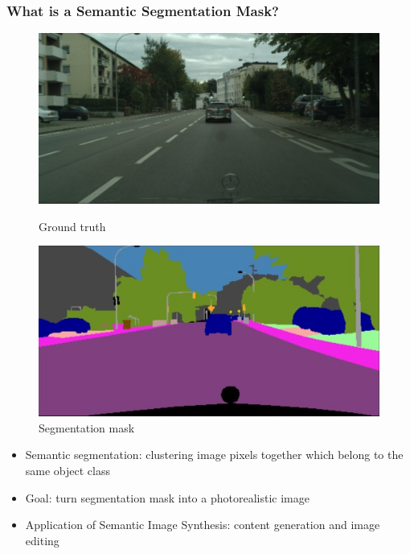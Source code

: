 \documentclass{beamer}
\begin{document}
\begin{frame}
	\frametitle{What is a Semantic Segmentation Mask?}
	
    \begin{figure}
        \begin{minipage}[b]{0.45\linewidth}
            \centering
            \includegraphics[width=\textwidth]{figures/ground_truth.png}
            \caption{Ground truth \cite{park2019semantic}}
        \end{minipage}
        \hspace{0.5cm}
        \begin{minipage}[b]{0.45\linewidth}
            \centering
            \includegraphics[width=\textwidth]{figures/segmentation.png}
            \caption{Segmentation mask \cite{park2019semantic}}
        \end{minipage}
    \end{figure}
    
    \begin{itemize}
	    \item Semantic segmentation: clustering image pixels together which belong to the same object class \cite{thoma2016survey}
	    \item Goal: turn segmentation mask into a photorealistic image
        \item Application of Semantic Image Synthesis: content generation and image editing
    \end{itemize}
\end{frame}
\end{document}

